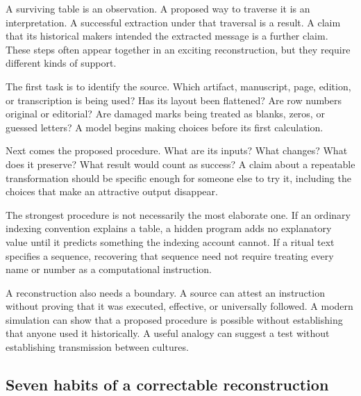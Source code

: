 \documentclass[11pt]{article}
\begin{document}
A surviving table is an observation. A proposed way to traverse it is an
interpretation. A successful extraction under that traversal is a result.
A claim that its historical makers intended the extracted message is a
further claim. These steps often appear together in an exciting reconstruction,
but they require different kinds of support.

The first task is to identify the source. Which artifact, manuscript,
page, edition, or transcription is being used? Has its layout been flattened?
Are row numbers original or editorial? Are damaged marks being treated as
blanks, zeros, or guessed letters? A model begins making choices before its
first calculation.

Next comes the proposed procedure. What are its inputs? What changes? What
does it preserve? What result would count as success? A claim about a
repeatable transformation should be specific enough for someone else to try
it, including the choices that make an attractive output disappear.

The strongest procedure is not necessarily the most elaborate one. If an
ordinary indexing convention explains a table, a hidden program adds no
explanatory value until it predicts something the indexing account cannot.
If a ritual text specifies a sequence, recovering that sequence need not
require treating every name or number as a computational instruction.

A reconstruction also needs a boundary. A source can attest an instruction
without proving that it was executed, effective, or universally followed.
A modern simulation can show that a proposed procedure is possible without
establishing that anyone used it historically. A useful analogy can suggest
a test without establishing transmission between cultures.

\subsection{Seven habits of a correctable reconstruction}
\end{document}
